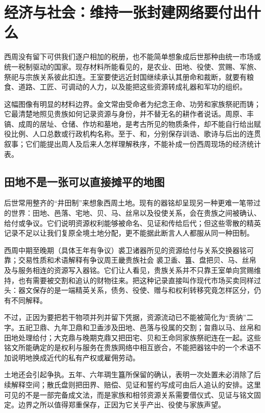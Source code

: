\section{经济与社会：维持一张封建网络要付出什么}

西周没有留下可供我们逐户相加的税册，也不能简单想象成后世那种由统一市场或统一税制驱动的国家。现存材料所能看见的，是农业、田地、役使、赏赐、军旅、祭祀与宗族关系彼此扣连。王室要使远近封国继续承认其册命和裁断，就要有粮食、道路、工匠、可调动的人力，以及能把这些资源转成礼器和军功的组织。

这幅图像有明显的材料边界。金文常由受命者为纪念王命、功劳和家族祭祀而铸；它最清楚地照见贵族如何记录资源与身份，并不替无名的耕作者说话。周原、丰镐、成周的居址、仓储、作坊和墓地，是考古所见的物质条件，却不能自行给出赋役比例、人口总数或行政机构名称。至于、和，分别保存训诰、歌诗与后出的连贯叙事；它们能提出周人及后来人怎样理解秩序，不能补成一份西周现场的经济统计表。

\subsection{田地不是一张可以直接摊平的地图}

后世常用整齐的“井田制”来想象西周土地。现有的器铭却呈现另一种更难一笔带过的世界：田地、邑落、宅地、贝、马、丝帛以及役使关系，会在贵族之间被确认、给付或争议。它们说明资源权利能够被命名、见证和传给后代；但这些零散的精英记录不足以让我们复原全境土地分配，更不能据此断言人人都服从同一种田制。

\begin{event}{西周中期至晚期（具体王年有争议）}{裘卫诸器所见的资源给付与关系交换}{器铭可靠；交易性质和术语解释有争议}{周王畿贵族社会}
裘卫盉、簋、盘把贝、马、丝帛及与服务相连的资源写入器铭。它们让人看见，贵族关系并不只靠王室单向赏赐维持，也有需要被交割和追认的财物往来。把这种记录直接叫作现代市场买卖同样过头：器文保存的是一端精英关系，债务、役使、赠与和权利转移究竟怎样区分，仍有不同解释。

不过，正因为要把若干物项并列并留下凭据，资源流动已不能被简化为“贡纳”二字。五祀卫鼎、九年卫鼎和卫盉涉及田地、邑落与役属的交割；曶鼎以马、丝帛和田地处理给付；大克鼎与晚期克鼎又把田宅、贝和王命同家族祭祀连在一起。这些铭文所能确定的是权利与服务在贵族网络中相互嵌合，不能把器铭中的一个术语不加说明地换成近代的私有产权或雇佣劳动。
\end{event}

土地还会引起争执。五年、六年琱生簋所保留的确认，表明一次处置未必消除了后续解释空间；散氏盘则把田界、赔偿、见证和誓约写成可由后人追认的安排。这里可见的不是一部完备成文法，而是家族和相邻资源关系需要借仪式、见证与铭文固定。边界之所以值得郑重保存，正因为它关乎产出、役使与家族声望。

